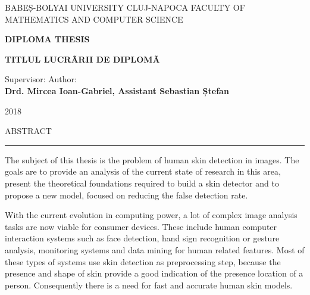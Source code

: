 \documentclass[12pt]{report}
\begin{document}
	
	\begin{titlepage}
		
		\begin{center}
			\Large{{BABEȘ-BOLYAI UNIVERSITY CLUJ-NAPOCA}}
			\newline
			\Large{{FACULTY OF MATHEMATICS AND COMPUTER SCIENCE}}
			
			\vspace{8cm}
			
			\textbf{DIPLOMA THESIS}
			
			\vspace{1cm}
			\Huge\textbf{{TITLUL LUCRÃRII DE DIPLOMÃ}}
			\fontsize{12}{14}
			
		\end{center}
		\vspace{6cm}
		
		\hspace*{0.8cm}Supervisor: \hfill  Author: \hspace*{0.8cm} \\    
		\textbf{Drd. Mircea Ioan-Gabriel, Assistant \hfill  \textbf{Sebastian Ștefan}}
		
		\vspace{2cm}
		\begin{center}
			\Large{2018}
		\end{center}
	\end{titlepage}


	\cleardoublepage
	ABSTRACT
	\vspace{0.5cm}	
	\hrule
	\vspace{0.5cm}	
	
	The subject of this thesis is the problem of human skin detection in images. The goals are to provide an analysis of the current state of research in this area, present the theoretical foundations required to build a skin detector and to propose a new model, focused on reducing the false detection rate.
	
	With the current evolution in computing power, a lot of complex image analysis tasks are now viable for consumer devices. These include human computer interaction systems such as face detection, hand sign recognition or gesture analysis, monitoring systems and data mining for human related features. Most of these types of systems use skin detection as preprocessing step, because the presence and shape of skin provide a good indication of the presence location of a person. Consequently there is a need for fast and accurate human skin models.
	
\end{document}
